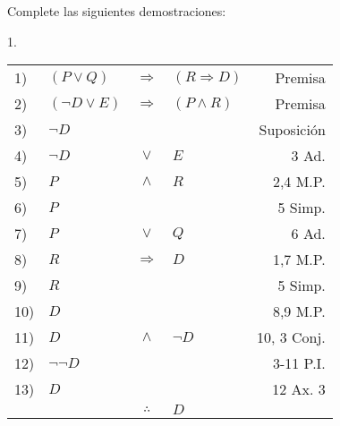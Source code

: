 \documentclass[12pt]{report}
\theoremstyle{largebreak}
\begin{document}
    \begin{excer}
        Complete las siguientes demostraciones:

        1.
        \begin{center}
            \begin{tabular}{l l c l r}
                1) & $(P\lor Q)$ & $\Rightarrow$ & $(R\Rightarrow D)$ & Premisa \\
                2) & $(\neg D\lor E)$ & $\Rightarrow$ & $(P\land R)$ & Premisa \\
                3) & $\neg D$ &  &  & Suposición \\
                4) & $\neg D$ & $\lor$ & $E$ & 3 Ad. \\
                5) & $P$ & $\land$ & $R$ & 2,4 M.P. \\
                6) & $P$ &  &  & 5 Simp. \\
                7) & $P$ & $\lor$ & $Q$ & 6 Ad. \\
                8) & $R$ & $\Rightarrow$ & $D$ & 1,7 M.P. \\
                9) & $R$ &  &  & 5 Simp. \\
                10) & $D$ &  &  & 8,9 M.P. \\
                11) & $D$ & $\land$ & $\neg D$ & 10, 3 Conj. \\
                12) & $\neg\neg D$ &  &  & 3-11 P.I. \\
                13) & $D$ &  &  & 12 Ax. 3 \\
                \hline
                & & $\therefore$ & $D$ & \\
            \end{tabular}
        \end{center}


\end{excer}
\end{document}
